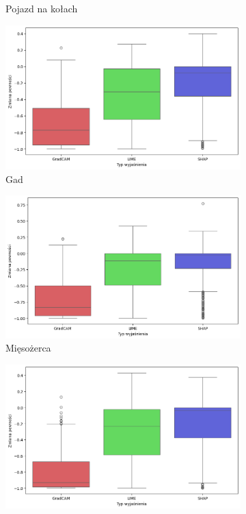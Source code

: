\begin{figure}[h]
\begin{subfigure}[b]{0.3\textwidth}
		\caption{Pojazd na kołach}  \label{rys:base_confidence_no_exp_vehicle}
	\end{subfigure}
	\begin{subfigure}[b]{0.3\textwidth}
		\centering\includegraphics[width=.9\textwidth]{img/base_confidence_no_exp_reptile}
		\caption{Gad}  \label{rys:base_confidence_no_exp_reptile}
	\end{subfigure}
	\begin{subfigure}[b]{0.3\textwidth}
		\centering\includegraphics[width=.9\textwidth]{img/base_confidence_no_exp_carnivore}
		\caption{Mięsożerca}  \label{rys:base_confidence_no_exp_carnivore}
	\end{subfigure}
	\begin{subfigure}[b]{0.3\textwidth}
		\centering\includegraphics[width=.9\textwidth]{img/base_confidence_no_exp_insect}

\end{subfigure}
\end{figure}
